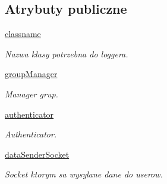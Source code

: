 \subsection*{Atrybuty publiczne}
\begin{CompactItemize}
\item 
\hypertarget{class_serv_1_1_parser_1_1_parser_98309dc29b98b9dbbaba8175bc6fce00}{
\hyperlink{class_serv_1_1_parser_1_1_parser_98309dc29b98b9dbbaba8175bc6fce00}{classname}}
\label{class_serv_1_1_parser_1_1_parser_98309dc29b98b9dbbaba8175bc6fce00}

\begin{CompactList}\small\item\em Nazwa klasy potrzebna do loggera. \item\end{CompactList}\item 
\hypertarget{class_serv_1_1_parser_1_1_parser_8e8fc28fb138a84f24593294eba5a237}{
\hyperlink{class_serv_1_1_parser_1_1_parser_8e8fc28fb138a84f24593294eba5a237}{groupManager}}
\label{class_serv_1_1_parser_1_1_parser_8e8fc28fb138a84f24593294eba5a237}

\begin{CompactList}\small\item\em Manager grup. \item\end{CompactList}\item 
\hypertarget{class_serv_1_1_parser_1_1_parser_59f3263667252c32bbe04baf2db0c12e}{
\hyperlink{class_serv_1_1_parser_1_1_parser_59f3263667252c32bbe04baf2db0c12e}{authenticator}}
\label{class_serv_1_1_parser_1_1_parser_59f3263667252c32bbe04baf2db0c12e}

\begin{CompactList}\small\item\em Authenticator. \item\end{CompactList}\item 
\hypertarget{class_serv_1_1_parser_1_1_parser_db376d9d8d99afa93fa43b3ca8153e9f}{
\hyperlink{class_serv_1_1_parser_1_1_parser_db376d9d8d99afa93fa43b3ca8153e9f}{dataSenderSocket}}
\label{class_serv_1_1_parser_1_1_parser_db376d9d8d99afa93fa43b3ca8153e9f}

\begin{CompactList}\small\item\em Socket ktorym sa wysylane dane do userow. \item\end{CompactList}\end{CompactItemize}


